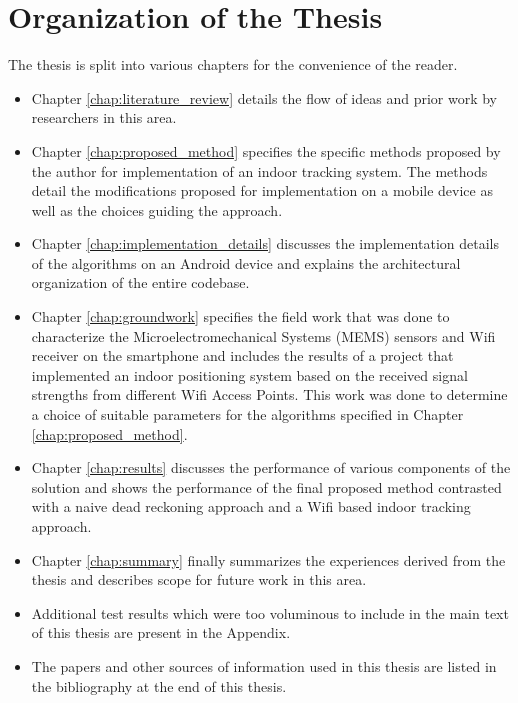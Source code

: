 \section{Organization of the Thesis}

The thesis is split into various chapters for the convenience of the reader.

\begin{itemize}
\item Chapter \ref{chap:literature_review} details the flow of ideas and prior
work by researchers in this area.

\item Chapter \ref{chap:proposed_method} specifies the specific methods proposed
by the author for implementation of an indoor tracking system. The methods
detail the modifications proposed for implementation on a mobile device as well
as the choices guiding the approach.

\item Chapter \ref{chap:implementation_details} discusses the implementation
details of the algorithms on an Android device and explains the architectural
organization of the entire codebase.

\item Chapter \ref{chap:groundwork} specifies the field work that was done to
characterize the Microelectromechanical Systems (MEMS) sensors and Wifi receiver on the smartphone and includes
the results of a project that implemented an indoor positioning system based on
the received signal strengths from different Wifi Access Points. This work was
done to determine a choice of suitable parameters for the algorithms specified
in Chapter \ref{chap:proposed_method}.

\item Chapter \ref{chap:results} discusses the performance of various components
of the solution and shows the performance of the final proposed method
contrasted with a naive dead reckoning approach and a Wifi based indoor tracking
approach.

\item Chapter \ref{chap:summary} finally summarizes the experiences derived from
the thesis and describes scope for future work in this area.

\item Additional test results which were
too voluminous to include in the main text of this thesis are present in 
the Appendix.

\item The papers and other sources of information used in this thesis are listed
in the bibliography at the end of this thesis.
\end{itemize}
